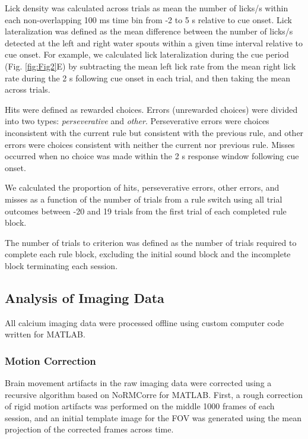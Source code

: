 Lick density was calculated across trials as mean the number of licks/s within each non-overlapping 100 ms time bin from -2 to 5 s relative to cue onset. Lick lateralization was defined as the mean difference between the number of licks/s detected at the left and right water spouts within a given time interval relative to cue onset. For example, we calculated lick lateralization during the cue period (Fig. \ref{fig:Fig2}E) by subtracting the mean left lick rate from the mean right lick rate during the 2 s following cue onset in each trial, and then taking the mean across trials.

Hits were defined as rewarded choices. Errors (unrewarded choices) were divided into two types: \emph{perseverative} and \emph{other}. Perseverative errors were choices inconsistent with the current rule but consistent with the previous rule, and other errors were choices consistent with neither the current nor previous rule. Misses occurred when no choice was made within the 2 s response window following cue onset.

We calculated the proportion of hits, perseverative errors, other errors, and misses as a function of the number of trials from a rule switch using all trial outcomes between -20 and 19 trials from the first trial of each completed rule block. 

The number of trials to criterion was defined as the number of trials required to complete each rule block, excluding the initial sound block and the incomplete block terminating each session.

\subsection*{Analysis of Imaging Data}

All calcium imaging data were processed offline using custom computer code written for MATLAB.  

\subsubsection*{Motion Correction}
Brain movement artifacts in the raw imaging data were corrected using a recursive algorithm based on NoRMCorre \citep{pnevmatikakis2017normcorre} for MATLAB. First, a rough correction of rigid motion artifacts was performed on the middle 1000 frames of each session, and an initial template image for the FOV was generated using the mean projection of the corrected frames across time. 

